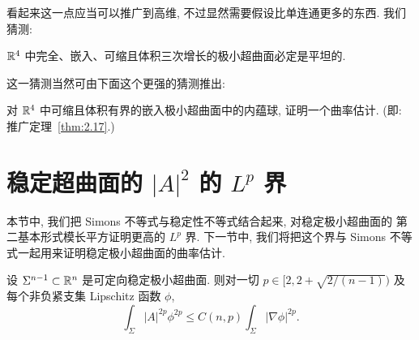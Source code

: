 看起来这一点应当可以推广到高维, 不过显然需要假设比单连通更多的东西. 我们
猜测:

\begin{conjecture}
\label{conj:2.19}
$\mathbb{R}^4$ 中完全、嵌入、可缩且体积三次增长的极小超曲面必定是平坦的.
\end{conjecture}

这一猜测当然可由下面这个更强的猜测推出:

\begin{conjecture}
\label{conj:2.20}
对 $\mathbb{R}^4$ 中可缩且体积有界的嵌入极小超曲面中的内蕴球, 证明一个曲率估计.
(即: 推广定理~\ref{thm:2.17}.)
\end{conjecture}

\section{稳定超曲面的 $|A|^{2}$ 的 $L^{p}$ 界}
\label{sec:2.4}

本节中, 我们把 Simons 不等式与稳定性不等式结合起来, 对稳定极小超曲面的
第二基本形式模长平方证明更高的 $L^{p}$ 界. 下一节中, 我们将把这个界与 Simons
不等式一起用来证明稳定极小超曲面的曲率估计.

\begin{theorem}
\label{thm:2.21}
设 $\Sigma^{n-1}\subset\mathbb{R}^n$ 是可定向稳定极小超曲面. 则对一切
$p\in\bigl[2,2+\sqrt{2/(n-1)}\bigr)$ 及每个非负紧支集 Lipschitz 函数 $\phi$,
\begin{equation}
\int_\Sigma|A|^{2p}\phi^{2p}\leq C(n,p)\int_\Sigma|\nabla\phi|^{2p}.
\label{eq:2.97}
\end{equation}
\end{theorem}

